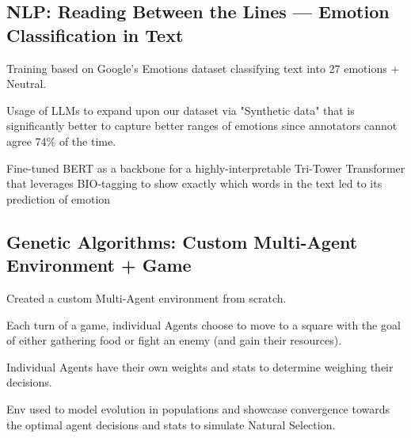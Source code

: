 \subsection{{NLP: Reading Between the Lines — Emotion Classification in Text}}
\begin{zitemize}
    \item Training based on Google's Emotions dataset classifying text into 27 emotions + Neutral.
    \item Usage of LLMs to expand upon our dataset via "Synthetic data" that is significantly better to capture better ranges of emotions since annotators cannot agree 74\% of the time. 
    \item Fine-tuned BERT as a backbone for a highly-interpretable Tri-Tower Transformer that leverages BIO-tagging to show exactly which words in the text led to its prediction of emotion
\end{zitemize}



\subsection{{Genetic Algorithms: Custom Multi-Agent Environment + Game}}
\begin{zitemize}
\item Created a custom Multi-Agent environment from scratch.
\item Each turn of a game, individual Agents choose to move to a square with the goal of either gathering food or fight an enemy (and gain their resources).
\item Individual Agents have their own weights and stats to determine weighing their decisions.
\item Env used to model evolution in populations and showcase convergence towards the optimal agent decisions and stats to simulate Natural Selection. 
\end{zitemize}




